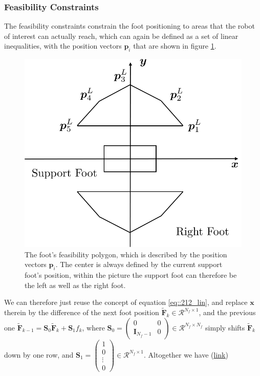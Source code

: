 \subsubsection{Feasibility Constraints}
The feasibility constraints constrain the foot positioning to areas that the robot of interest can actually reach, which can again be defined as a set of linear inequalities, with the position vectors $\bm{p}_i$ that are shown in figure \ref{fig::212_foot_feasibility}. 
\begin{figure}[h!]
	\centering
	\includegraphics[scale=.5]{chapters/02_foundations_for_humanoid_walking/img/foot_constraints.png}
	\caption{The foot's feasibility polygon, which is described by the position vectors $\bm{p}_i$. The center is always defined by the current support foot's position, within the picture the support foot can therefore be the left as well as the right foot.}
	\label{fig::212_foot_feasibility}
\end{figure}
We can therefore just reuse the concept of equation \ref{eq::212_lin}, and replace $\bm{x}$ therein by the difference of the next foot position $\tilde{\bm{F}}_{k}\in\mathcal{R}^{N_f\times1}$, and the previous one $\tilde{\bm{F}}_{k-1} = \bm{S}_0\tilde{\bm{F}}_{k} + \bm{S}_1f_k$, where $\bm{S}_0 = \begin{pmatrix}0 & 0 \\ \textbf{I}_{N_f-1} & 0
\end{pmatrix}\in\mathcal{R}^{N_f\times N_f}$ simply shifts $\tilde{\bm{F}}_{k}$ down by one row, and $\bm{S}_1 = \begin{pmatrix}
1 \\ 0 \\ \vdots \\ 0
\end{pmatrix}\in\mathcal{R}^{N_f\times1}$. Altogether we have (\href{https://github.com/mhubii/nmpc_pattern_generator/blob/dc1f5a9366cbbbf76f1b02cada642f6ac9a04c89/libs/pattern_generator/src/base_generator.cpp#L1061}{\underline{link}})
